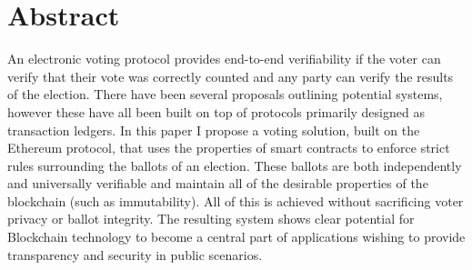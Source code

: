 \documentclass{article}
\begin{document}
    \section{Abstract}
   An electronic voting protocol provides end-to-end verifiability if the voter can verify that their vote was correctly counted and any party can verify the results of the election. There have been several proposals outlining potential systems, however these have all been built on top of protocols primarily designed as transaction ledgers. In this paper I propose a voting solution, built on the Ethereum protocol, that uses the properties of smart contracts to enforce strict rules surrounding the ballots of an election. These ballots are both independently and universally verifiable and maintain all of the desirable properties of the blockchain (such as immutability). All of this is achieved without sacrificing voter privacy or ballot integrity. The resulting system shows clear potential for Blockchain technology to become a central part of applications wishing to provide transparency and security in public scenarios.
\end{document}

